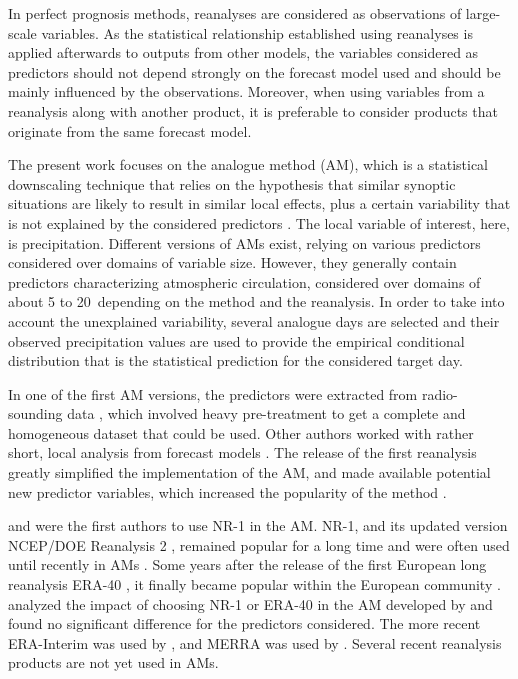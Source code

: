 \documentclass{ametsoc}
\begin{document}
	In perfect prognosis methods, reanalyses are considered as observations of large-scale variables. As the statistical relationship established using reanalyses is applied afterwards to outputs from other models, the variables considered as predictors should not depend strongly on the forecast model used and should be mainly influenced by the observations. Moreover, when using variables from a reanalysis along with another product, it is preferable to consider products that originate from the same forecast model.
	
	The present work focuses on the analogue method (AM), which is a statistical downscaling technique that relies on the hypothesis that similar synoptic situations are likely to result in similar local effects, plus a certain variability that is not explained by the considered predictors \citep{Lorenz1969}. The local variable of interest, here, is precipitation. Different versions of AMs exist, relying on various predictors considered over domains of variable size. However, they generally contain predictors characterizing atmospheric circulation, considered over domains of about 5 to 20\degree\ depending on the method and the reanalysis. In order to take into account the unexplained variability, several analogue days are selected and their observed precipitation values are used to provide the empirical conditional distribution that is the statistical prediction for the considered target day.
	
	In one of the first AM versions, the predictors were extracted from radio-sounding data \citep{Duband1981}, which involved heavy pre-treatment to get a complete and homogeneous dataset that could be used. Other authors worked with rather short, local analysis from forecast models \cite[for example][]{Kruizinga1983, VandenDool1989}. The release of the first reanalysis \citep[NCEP/NCAR Reanalysis I, NR-1 --][]{Kalnay1996, Kistler2001} greatly simplified the implementation of the AM, and made available potential new predictor variables, which increased the popularity of the method \citep{Timbal2008a}.
	
	\citet{Timbal2003} and \citet{Bontron2004} were the first authors to use NR-1 in the AM. NR-1, and its updated version NCEP/DOE Reanalysis 2 \citep[NR-2 --][]{Kanamitsu2002}, remained popular for a long time and were often used until recently in AMs \citep{Wetterhall2005a, Gangopadhyay2005, Altava-Ortiz2006, Barrera2007, Cannon2007, Matulla2007, Bliefernicht2007, Maurer2008, Wu2012, Marty2012, Teng2012, Horton2012, Yiou2014}. Some years after the release of the first European long reanalysis ERA-40 \citep{Uppala2005}, it finally became popular within the European community \citep {Willems2011b, JakobThemessl2011a, BenDaoud2011, Turco2011a, Franke2011, Pascual2012b, Schenk2012, Ribalaygua2013a, Osca2013, Radanovics2013, Martin2014b, Chardon2014, BenDaoud2016}. \citet{BenDaoud2009} analyzed the impact of choosing NR-1 or ERA-40 in the AM developed by \citet{Bontron2004} and found no significant difference for the predictors considered. The more recent ERA-Interim \citep[ERA-INT, ][]{Dee2011a} was used by \cite{Raynaud2016b}, and MERRA \citep{Rienecker2011} was used by \citet{Vanvyve2015}. Several recent reanalysis products are not yet used in AMs.
	
\end{document}

